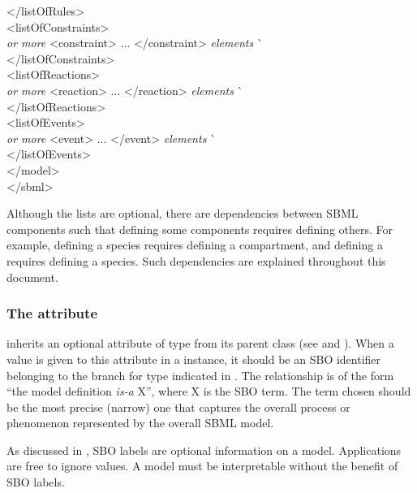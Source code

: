 \begin{tt}
\begin{tabbing}
\>\></listOfRules>\\
\>\><listOfConstraints>\\
\>\>\>\textrm{\emph{ or more}} <constraint> ... </constraint> \textrm{\emph{elements}}  \` \sayOptional\\
\>\></listOfConstraints>\\
\>\><listOfReactions>\\
\>\>\>\textrm{\emph{ or more}} <reaction> ... </reaction> \textrm{\emph{elements}}  \` \sayOptional\\
\>\></listOfReactions>\\
\>\><listOfEvents>\\
\>\>\>\textrm{\emph{ or more}} <event> ... </event> \textrm{\emph{elements}}  \` \sayOptional\\
\>\></listOfEvents>\\
\></model>\\
</sbml>
\end{tabbing}
\regularspacing
\end{tt}
\vspace*{1.5ex}

Although the lists are optional, there are dependencies between
SBML components such that defining some components requires
defining others.  For example, defining a species requires
defining a compartment, and defining a  requires defining
a species.  Such dependencies are explained throughout this
document.
  

\subsubsection{The  attribute}
\label{sec:model-sboterm}

\Model inherits an optional  attribute of type
 from its parent class \SBase (see
 and ).  When a
value is given to this attribute in a \Model instance, it should
be an SBO identifier belonging to the branch for type \Model
indicated in .  The
  relationship is of the form ``the model definition \emph{is-a}
  X'', where X is the SBO term.  The term chosen should be the
most precise (narrow) one that captures the overall process or
phenomenon represented by the overall SBML model.

As discussed in , SBO labels are optional
information on a model.  Applications are free to ignore
 values.  A model must be interpretable without the
benefit of SBO labels.


